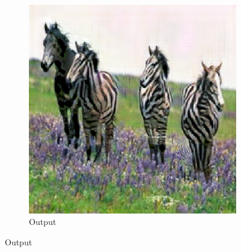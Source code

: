 \begin{figure}
\begin{subfigure}[t]{.2\textwidth}
  \end{subfigure}
  \begin{subfigure}[t]{.2\textwidth}
    \caption{Output}
    \centering
    \includegraphics[width=\linewidth]{images/cycleGanResults/horse_output1.png}
  \end{subfigure}

  \medskip


\end{figure}
